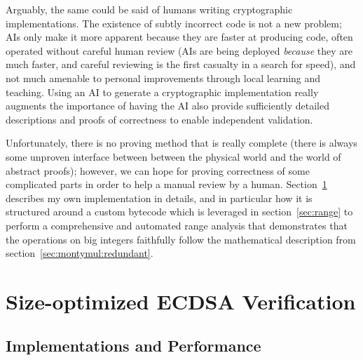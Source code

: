 \documentclass{llncs}
\begin{document}
Arguably, the same could be said of humans writing cryptographic
implementations. The existence of subtly incorrect code is not a new
problem; AIs only make it more apparent because they are faster at
producing code, often operated without careful human review (AIs are
being deployed \emph{because} they are much faster, and careful
reviewing is the first casualty in a search for speed), and not much
amenable to personal improvements through local learning and teaching.
Using an AI to generate a cryptographic implementation really augments
the importance of having the AI also provide sufficiently detailed
descriptions and proofs of correctness to enable independent validation.

Unfortunately, there is no proving method that is really complete (there
is always some unproven interface between between the physical world and
the world of abstract proofs); however, we can hope for proving
correctness of some complicated parts in order to help a manual review
by a human. Section~\ref{sec:bytecode} describes my own implementation
in details, and in particular how it is structured around a custom
bytecode which is leveraged in section~\ref{sec:range} to perform a
comprehensive and automated range analysis that demonstrates that the
operations on big integers faithfully follow the mathematical
description from section~\ref{sec:montymul:redundant}.


\newpage
\section{Size-optimized ECDSA Verification}\label{sec:bytecode}

\subsection{Implementations and Performance}
\end{document}
